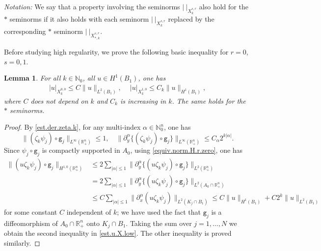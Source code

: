 \documentclass[10pt,reqno,a4paper]{article}
\numberwithin{equation}{section}
\theoremstyle{plain}
\newtheorem{lemma}[theorem]{Lemma}
\theoremstyle{definition}
\newcommand{\N}{{\mathbb N}}
\newcommand{\R}{{\mathbb R}}
\renewcommand{\a}{\alpha}
\newcommand{\pa}{\partial}
\begin{document}
\emph{Notation:} We say that a property involving the seminorms $| \ |_{X^{s,r}_k}$ 
also hold for the $*$ seminorms if it also holds with each seminorm $| \ |_{X^{s,r}_k}$ 
replaced by the corresponding $*$ seminorm $| \ |_{X^{s,r}_{*,k}}$. 

Before studying high regularity, 
we prove the following basic inequality for $r = 0$, $s = 0,1$. 

\begin{lemma} \label{lemma:low.norm.u.n.X}
For all $k \in \N_0$, all $u \in H^1(B_1)$, one has 
\begin{align} \label{est.u.X.low}
|u|_{X^{0,0}_k} \leq C \| u \|_{L^2(B_1)}, \quad \ 
|u|_{X^{1,0}_k} \leq C_k \| u \|_{H^1(B_1)}, 
\end{align}
where $C$ does not depend on $k$ 
and $C_k$ is increasing in $k$. 
The same holds for the $*$ seminorms. 
\end{lemma}

\begin{proof}
By \eqref{est.der.zeta.k}, for any multi-index $\a \in \N_0^n$, one has  
\begin{equation}  \label{est.zeta.k.psi.j}
\| (\zeta_k \psi_j) \circ \mathtt g_j \|_{L^\infty(\R^n_+)} \leq 1, \quad 
\| \pa_y^\a \{ (\zeta_k \psi_j) \circ \mathtt g_j \} \|_{L^\infty(\R^n_+)} \leq C_\a 2^{k|\a|}. 
\end{equation}
Since $\psi_j \circ \mathtt g_j$ is compactly supported in $A_0$, 
using \eqref{equiv.norm.H.r.zero}, one has 
\begin{align*}
\| (u \zeta_k \psi_j) \circ \mathtt g_j \|_{H^{1,0}(\R^n_+)} 
& \leq 2 \sum_{|\a| \leq 1} \| \pa_y^\a \{ (u \zeta_k \psi_j) \circ \mathtt g_j \} \|_{L^2(\R^n_+)}
\\ & 
= 2 \sum_{|\a| \leq 1} \| \pa_y^\a \{ (u \zeta_k \psi_j) \circ \mathtt g_j \} \|_{L^2(A_0 \cap \R^n_+)}
\\ & 
\leq C \sum_{|\a| \leq 1} \| \pa_x^\a (u \zeta_k \psi_j) \|_{L^2(K_j \cap B_1)} 
\leq C \| u \|_{H^1(B_1)} + C 2^k \| u \|_{L^2(B_1)}
\end{align*}
for some constant $C$ independent of $k$;
we have used the fact that $\mathtt g_j$ is a diffeomorphism of $A_0 \cap \R^n_+$ onto $K_j \cap B_1$.
Taking the sum over $j = 1, \ldots, N$ we obtain the second inequality in \eqref{est.u.X.low}. 
The other inequality is proved similarly. 
\end{proof}
\end{document}
